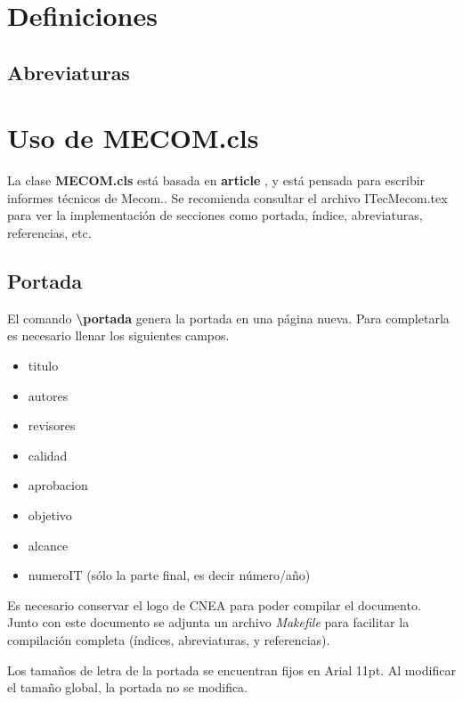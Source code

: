 \documentclass[a4paper,11pt,twoside]{MECOM}
\begin{document}
    \portada
    
    \tableofcontents    
    
    \section{Definiciones}
    \subsection{Abreviaturas}
        \printnomenclature[2cm]
        
    \section{Uso de MECOM.cls}
    La clase {\bf MECOM.cls} est\'a basada en {\bf article} \cite{hefferon_minutes_2005}, y est\'a pensada para escribir informes t\'ecnicos de Mecom.. Se recomienda consultar el archivo ITec\textunderscore Mecom.tex para ver la implementaci\'on de secciones como portada, \'indice, abreviaturas, referencias, etc.
    
    \subsection{Portada}
        El comando {\bf \textbackslash portada} genera la portada en una p\'agina nueva. Para completarla es necesario llenar los siguientes campos.
        \begin{itemize}
            \item titulo
            \item autores
            \item revisores
            \item calidad
            \item aprobacion
            \item objetivo
            \item alcance
            \item numeroIT (s\'olo la parte final, es decir n\'umero/a\~no)
        \end{itemize}
        \par
        Es necesario conservar el logo de CNEA para poder compilar el documento. Junto con este documento se adjunta un archivo \emph{Makefile} para facilitar la compilaci\'on completa (\'indices, abreviaturas, y referencias).
        \par
        Los tama\~nos de letra de la portada se encuentran fijos en Arial 11pt. Al modificar el tama\~no global, la portada no se modifica.
        
\end{document}
